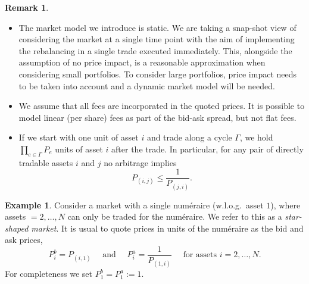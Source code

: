 \documentclass{article}
\theoremstyle{definition}
\newtheorem{example}[theorem]{Example}
\newtheorem{remark}[theorem]{Remark}
\begin{document}
\begin{remark} 
\begin{itemize}
    \item[(i)] The market model we introduce is static. We are taking a snap-shot view of considering the market at a single time point with the aim of implementing the rebalancing in a single trade executed immediately. This, alongside the assumption of no price impact, is a reasonable approximation when considering small portfolios. To consider large portfolios, price impact needs to be taken into account and a dynamic market model will be needed.
    \item[(ii)] We assume that all fees are incorporated in the quoted prices. It is possible to model linear (per share) fees as part of the bid-ask spread, but not flat fees.
    \item[(iii)] If we start with one unit of asset $i$ and trade along a cycle $\Gamma$, we hold $\prod_{e \in \Gamma} P_e$ units of asset $i$ after the trade. In particular, for any pair of directly tradable assets $i$ and $j$ no arbitrage implies
    $$P_{(i,j)}  \leq \frac{1}{P_{(j,i)}}.$$
\end{itemize}
\end{remark}

\begin{example}\label{ex:star1}
Consider a market with a single num\'eraire (w.l.o.g.~asset $1$), where assets $=2, \dots, N$ can only be traded for the num\'eraire. We refer to this as a \emph{star-shaped market}. It is usual to quote prices in units of the num\'eraire as the bid and ask prices,
\[
P^b_i  = P_{(i, 1)} \quad \text{ and } \quad P^a_i = \frac{1}{P_{(1, i)}} \quad \text{ for assets } i = 2, \dots, N.
\] 
For completeness we set $P^b_1 = P^a_1 := 1$.
\end{example}
\end{document}
